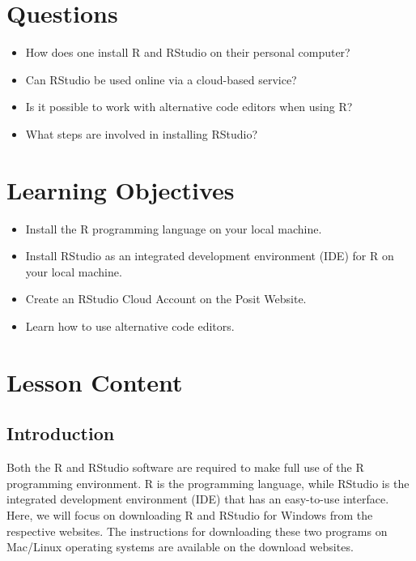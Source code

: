 \documentclass[
  letterpaper,
  DIV=11,
  numbers=noendperiod]{scrreprt}
\begin{document}
\section{Questions}\label{questions-1}

\begin{itemize}
\item
  How does one install R and RStudio on their personal computer?
\item
  Can RStudio be used online via a cloud-based service?
\item
  Is it possible to work with alternative code editors when using R?
\item
  What steps are involved in installing RStudio?
\end{itemize}

\section{Learning Objectives}\label{learning-objectives-1}

\begin{itemize}
\item
  Install the R programming language on your local machine.
\item
  Install RStudio as an integrated development environment (IDE) for R
  on your local machine.
\item
  Create an RStudio Cloud Account on the Posit Website.
\item
  Learn how to use alternative code editors.
\end{itemize}

\section{Lesson Content}\label{lesson-content-1}

\subsection{Introduction}\label{introduction-1}

Both the R and RStudio software are required to make full use of the R
programming environment. R is the programming language, while RStudio is
the integrated development environment (IDE) that has an easy-to-use
interface. Here, we will focus on downloading R and RStudio for Windows
from the respective websites. The instructions for downloading these two
programs on Mac/Linux operating systems are available on the download
websites.
\end{document}
